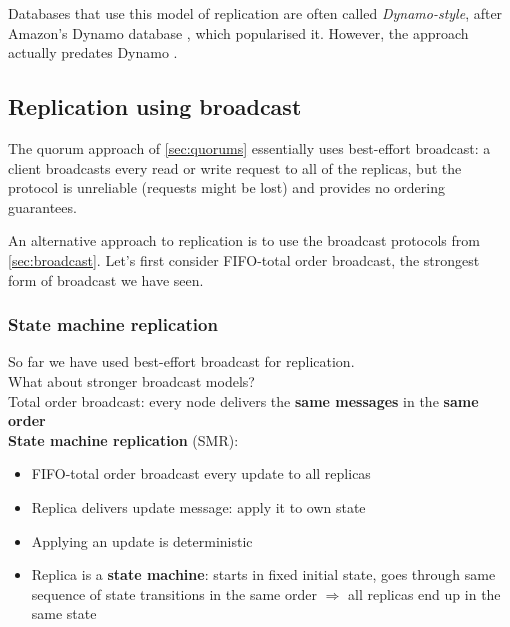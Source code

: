 Databases that use this model of replication are often called \emph{Dynamo-style}, after Amazon's Dynamo database \citep{DeCandia:2007}, which popularised it.
However, the approach actually predates Dynamo \citep{Attiya:1995}.

\subsection{Replication using broadcast}\label{sec:broadcast-replication}

The quorum approach of \autoref{sec:quorums} essentially uses best-effort broadcast: a client broadcasts every read or write request to all of the replicas, but the protocol is unreliable (requests might be lost) and provides no ordering guarantees.

An alternative approach to replication is to use the broadcast protocols from \autoref{sec:broadcast}.
Let's first consider FIFO-total order broadcast, the strongest form of broadcast we have seen.

\begin{frame}
    \label{s:smr}
    \frametitle{State machine replication}
    So far we have used best-effort broadcast for replication.\\
    What about stronger broadcast models?\\[1em]\pause
    Total order broadcast: every node delivers the \textbf{same messages} in the \textbf{same order}\\[1em]\pause
    \textbf{State machine replication} (SMR):
    \begin{itemize}
        \item FIFO-total order broadcast every update to all replicas
        \item Replica delivers update message: apply it to own state\pause
        \item Applying an update is deterministic\pause
        \item Replica is a \textbf{state machine}: starts in fixed initial state,
            goes through same sequence of state transitions in the same order
            $\Longrightarrow$ all replicas end up in the same state
    \end{itemize}
\end{frame}
\label{l:smr}

